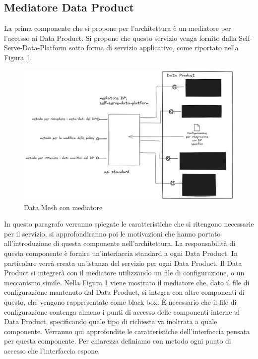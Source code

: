 \documentclass[a4paper,12pt]{report}
\begin{document}
\subsection{Mediatore Data Product}
La prima componente che si propone per l'architettura è un mediatore per l'accesso ai Data Product.
Si propone che questo servizio venga fornito dalla Self-Serve-Data-Platform sotto forma di servizio applicativo, come riportato nella Figura \ref{fig:dp solo mediatore}.
\begin{figure}
    \centering
    \includegraphics[width=\linewidth]{immagini/Data mesh con interfaccie.png}
    \caption{Data Mesh con mediatore}
    \label{fig:dp solo mediatore}
\end{figure}
In questo paragrafo verranno spiegate le caratteristiche che si ritengono necessarie per il servizio, si approfondiranno poi le motivazioni che hanno portato all'introduzione di questa componente nell'architettura.
La responsabilità di questa componente è fornire un'interfaccia standard a ogni Data Product.
In particolare verrà creata un'istanza del servizio per ogni Data Product.
Il Data Product si integrerà con il mediatore utilizzando un file di configurazione, o un meccanismo simile.
Nella Figura \ref{fig:dp solo mediatore}  viene mostrato il mediatore che, dato il file di configurazione mantenuto dal Data Product, si integra con altre componenti di questo, che vengono rappresentate come black-box.
È necessario che il file di configurazione contenga almeno i punti di accesso delle componenti interne al Data Product, specificando quale tipo di richiesta va inoltrata a quale componente.
Verranno qui approfondite le caratteristiche  dell'interfaccia pensata per questa componente.
Per chiarezza definiamo con metodo ogni punto di accesso che l'interfaccia espone.
\end{document}
